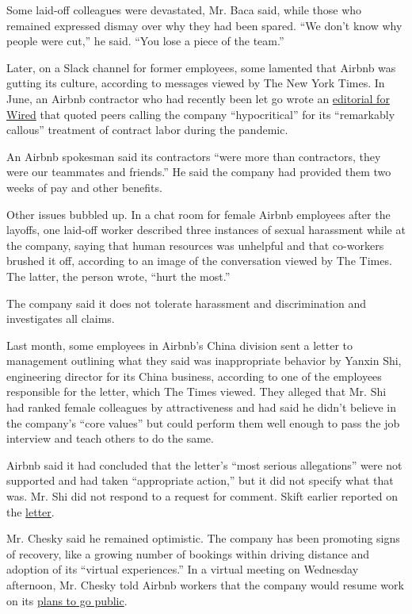 Some laid-off colleagues were devastated, Mr. Baca said, while those who
remained expressed dismay over why they had been spared. ``We don't know
why people were cut,'' he said. ``You lose a piece of the team.''

Later, on a Slack channel for former employees, some lamented that
Airbnb was gutting its culture, according to messages viewed by The New
York Times. In June, an Airbnb contractor who had recently been let go
wrote an
\href{https://www.wired.com/story/airbnb-quietly-fired-hundreds-of-contract-workers-im-one-of-them/}{editorial
for Wired} that quoted peers calling the company ``hypocritical'' for
its ``remarkably callous'' treatment of contract labor during the
pandemic.

An Airbnb spokesman said its contractors ``were more than contractors,
they were our teammates and friends.'' He said the company had provided
them two weeks of pay and other benefits.

Other issues bubbled up. In a chat room for female Airbnb employees
after the layoffs, one laid-off worker described three instances of
sexual harassment while at the company, saying that human resources was
unhelpful and that co-workers brushed it off, according to an image of
the conversation viewed by The Times. The latter, the person wrote,
``hurt the most.''

The company said it does not tolerate harassment and discrimination and
investigates all claims.

Last month, some employees in Airbnb's China division sent a letter to
management outlining what they said was inappropriate behavior by Yanxin
Shi, engineering director for its China business, according to one of
the employees responsible for the letter, which The Times viewed. They
alleged that Mr. Shi had ranked female colleagues by attractiveness and
had said he didn't believe in the company's ``core values'' but could
perform them well enough to pass the job interview and teach others to
do the same.

Airbnb said it had concluded that the letter's ``most serious
allegations'' were not supported and had taken ``appropriate action,''
but it did not specify what that was. Mr. Shi did not respond to a
request for comment. Skift earlier reported on the
\href{https://skift.com/2020/06/12/airbnb-investigates-allegations-of-sexual-harassment-against-a-top-chinese-exec/}{letter}.

Mr. Chesky said he remained optimistic. The company has been promoting
signs of recovery, like a growing number of bookings within driving
distance and adoption of its ``virtual experiences.'' In a virtual
meeting on Wednesday afternoon, Mr. Chesky told Airbnb workers that the
company would resume work on its
\href{https://www.nytimes3xbfgragh.onion/2020/07/15/technology/airbnb-ipo.html}{plans
to go public}.

